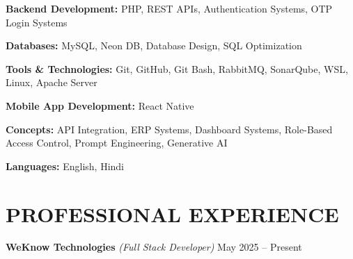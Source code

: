 \documentclass[a4paper,10.9pt]{article}
\begin{document}
\textbf{Backend Development:} PHP, REST APIs, Authentication Systems, OTP Login Systems

\textbf{Databases:} MySQL, Neon DB, Database Design, SQL Optimization

\textbf{Tools \& Technologies:} Git, GitHub, Git Bash, RabbitMQ, SonarQube, WSL, Linux, Apache Server

\textbf{Mobile App Development:} React Native

\textbf{Concepts:} API Integration, ERP Systems, Dashboard Systems, Role-Based Access Control, Prompt Engineering, Generative AI

\textbf{Languages:} English, Hindi


\section*{PROFESSIONAL EXPERIENCE}

{\large\textbf{\color{hdrblue}WeKnow Technologies}}
\textit{(Full Stack Developer)} \hfill May 2025 -- Present
\end{document}
